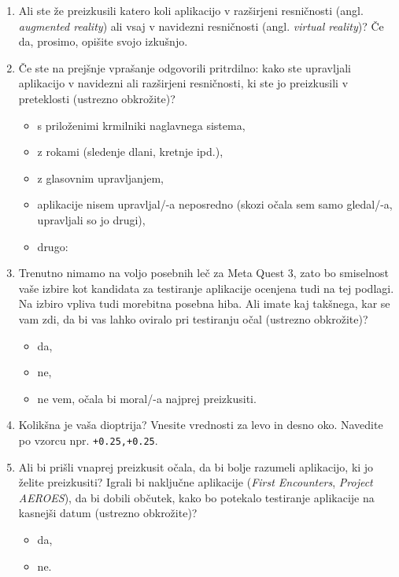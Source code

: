 \documentclass[a4paper, 12pt]{book}
\begin{document}
\begin{enumerate}
    \item Ali ste že preizkusili katero koli aplikacijo v razširjeni
    resničnosti (angl. \textit{augmented reality}) ali vsaj v navidezni
    resničnosti (angl. \textit{virtual reality})? Če da, prosimo, opišite
    svojo izkušnjo. \dotfill

    \item Če ste na prejšnje vprašanje odgovorili pritrdilno: kako ste
    upravljali aplikacijo v navidezni ali razširjeni resničnosti, ki ste jo
    preizkusili v preteklosti (ustrezno obkrožite)?
    \begin{itemize}
        \item s priloženimi krmilniki naglavnega sistema,
        \item z rokami (sledenje dlani, kretnje ipd.),
        \item z glasovnim upravljanjem,
        \item aplikacije nisem upravljal/-a neposredno
        (skozi očala sem samo gledal/-a, upravljali so jo drugi),
        \item drugo: \dotfill
    \end{itemize}

    \item Trenutno nimamo na voljo posebnih leč za Meta Quest 3, zato bo
    smiselnost vaše izbire kot kandidata za testiranje aplikacije ocenjena
    tudi na tej podlagi. Na izbiro vpliva tudi morebitna posebna hiba.
    Ali imate kaj takšnega, kar se vam zdi, da bi vas lahko oviralo pri
    testiranju očal (ustrezno obkrožite)?
    \begin{itemize}
        \item da,
        \item ne,
        \item ne vem, očala bi moral/-a najprej preizkusiti.
    \end{itemize}

    \item Kolikšna je vaša dioptrija? Vnesite vrednosti za levo in desno oko.
    Navedite po vzorcu npr. \texttt{+0.25,+0.25}. \dotfill

    \item Ali bi prišli vnaprej preizkusit očala, da bi bolje razumeli
    aplikacijo, ki jo želite preizkusiti? Igrali bi naključne aplikacije
    (\textit{First Encounters}, \textit{Project AEROES}), da bi dobili
    občutek, kako bo potekalo testiranje aplikacije na kasnejši datum
    (ustrezno obkrožite)?
    \begin{itemize}
        \item da,
        \item ne.
    \end{itemize}


\end{enumerate}
\end{document}
